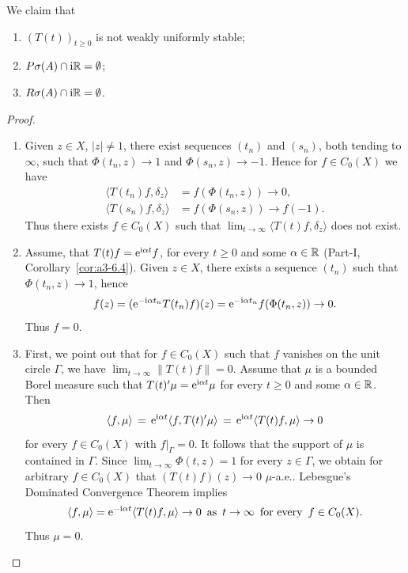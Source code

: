 \begin{example}
\begin{enumerate}[\upshape (i), wide, labelindent=.25em]
 
We claim that
\begin{enumerate}[\upshape  (1)]
	\item 
	$(T(t))_{t \geq 0}$ is not weakly uniformly stable;
	
	\item 
	$P\sigma(A)\cap\mathrm{i}\mathbb{R} = \emptyset$;
	
	\item 
	$R\sigma(A)\cap\mathrm{i}\mathbb{R} = \emptyset$.
\end{enumerate}
\begin{proof}
\begin{enumerate}[\upshape (1), wide, labelindent=.25em]

\item
Given $z \in X$, $|z| \neq 1$, there exist sequences $(t_n)$ and $(s_n)$, both tending to $\infty$, such that $\Phi(t_n,z) \to 1$ and $\Phi(s_n,z) \to -1$. 
Hence for $f \in C_{0}(X)$ we have
\[
   \begin{aligned}
   \langle T(t_n)f,\delta_z \rangle &= f(\Phi(t_n,z)) \to 0 ,\\
   \langle T(s_n)f,\delta_z \rangle &= f(\Phi(s_n,z)) \to f(-1) .
   \end{aligned}
\]
Thus there exists $f \in C_{0}(X)$ such that $\lim_{t\to\infty} \langle T(t)f,\delta_z \rangle$ does not exist.


\item
Assume, that $T(t)f = \mathrm{e}^{\mathrm{i}\alpha t}f$, for every $t \geq 0$ and some $\alpha \in \mathbb{R}$ (\cf Part-I, Corollary~\ref{cor:a3-6.4}). 
Given $z \in X$, there exists a sequence $(t_n)$ such that $\Phi(t_n,z) \to 1$, hence
\[f(z) = (\mathrm{e}^{-\mathrm{i}\alpha t_n}T(t_n)f)(z) = \mathrm{e}^{-\mathrm{i}\alpha t_n}f(\Phi(t_n,z)) \to 0. 
\]
Thus $f = 0$.




\item
First, we point out that for $f \in C_{0}(X)$ such that $f$ vanishes on the unit circle $\Gamma$, we have $\lim_{t\to\infty} \|T(t)f\| = 0$.
Assume that $\mu$ is a bounded Borel measure such that $T(t)'\mu = \mathrm{e}^{\mathrm{i}\alpha t}\mu$ for every $t \geq 0$ and some $\alpha \in \mathbb{R}$. 
Then 
\[\langle f,\mu \rangle \,=\, \mathrm{e}^{\mathrm{i}\alpha t}\langle f,T(t)'\mu \rangle \,=\, \mathrm{e}^{\mathrm{i}\alpha t}\langle T(t)f,\mu \rangle \to 0
\]
for every $f \in C_{0}(X)$ with $f|_\Gamma = 0$. 
It follows that the support of\/ $\mu$ is contained in $\Gamma$. Since $\lim_{t\to\infty} \Phi(t,z) = 1$ for every $z \in \Gamma$, we obtain for arbitrary $f \in C_{0}(X)$ that $(T(t)f)(z) \to 0$ $\mu$-a.e.. 
Lebesgue's Dominated Convergence Theorem implies 
\[
\langle f,\mu \rangle = \mathrm{e}^{-\mathrm{i}\alpha t}\langle T(t)f,\mu \rangle \to 0
\text{ \,as\, } 
t \to \infty
\text{ \,for every\, } 
f \in C_{0}(X).
\]
Thus $\mu = 0$.
\qedhere
\end{enumerate}
\end{proof}
\end{enumerate}
\end{example}
